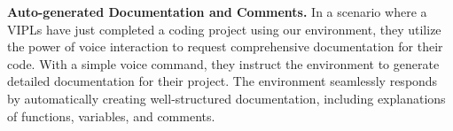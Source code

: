 {\bf Auto-generated Documentation and Comments.} In a scenario where a
VIPLs have just completed a coding project using our environment, they
utilize the power of voice interaction to request comprehensive
documentation for their code. With a simple voice command, they
instruct the environment to generate detailed documentation for their
project. The environment seamlessly responds by automatically creating
well-structured documentation, including explanations of functions,
variables, and comments.









